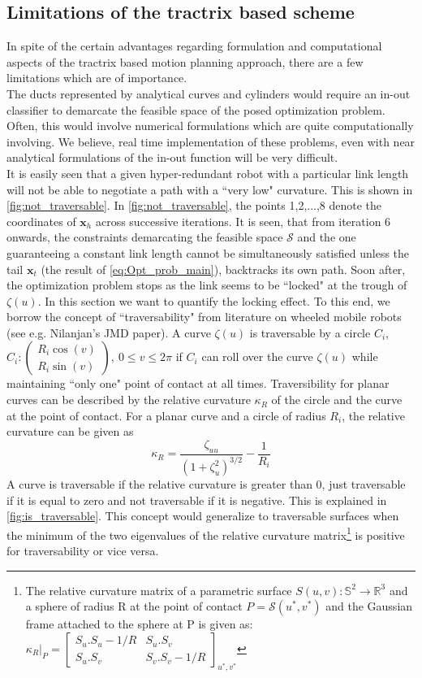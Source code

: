 \documentclass[12pt,a4]{article}
\begin{document}
\subsection{Limitations of the tractrix based scheme}
In spite of the certain advantages regarding formulation and computational aspects of the tractrix based motion planning approach, there are a few limitations which are of importance.\\
The ducts represented by analytical curves and cylinders would require an in-out classifier to demarcate the feasible space of the posed optimization problem. Often, this would involve numerical formulations which are quite computationally involving. We believe, real time implementation of these problems, even with near analytical formulations of the in-out function will be very difficult.\\
It is easily seen that a given hyper-redundant robot with a particular link length will not be able to negotiate a path with a ``very low" curvature. This is shown in \cref{fig:not_traversable}. In \cref{fig:not_traversable}, the points 1,2,...,8 denote the coordinates of $\textbf{x}_h$ across successive iterations. It is seen, that from iteration 6 onwards, the constraints demarcating the feasible space $\mathcal{S}$ and the one guaranteeing a constant link length cannot be simultaneously satisfied unless the tail $\textbf{x}_t$ (the result of \cref{eq:Opt_prob_main}), backtracks its own path. Soon after, the optimization problem stops as the link seems to be ``locked" at the trough of $\zeta(u)$. In this section we want to quantify the locking effect. To this end, we borrow the concept of ``traversability" from literature on wheeled mobile robots (see e.g. Nilanjan's JMD paper). A curve $\zeta(u)$ is traversable by a circle $C_i$, $C_i: \left(\begin{array}{c} R_i\cos(v) \\ R_i\sin(v) \end{array}\right), ~ 0 \leq v\leq2\pi $  if $C_i$ can roll over the curve $\zeta(u)$ while maintaining ``only one" point of contact at all times. Traversibility for planar curves can be described by the relative curvature $\kappa_R$ of the circle and the curve at the point of contact. For a planar curve and a circle of radius $R_i$, the relative curvature can be given as \[\kappa_R=\dfrac{\zeta_{uu}}{(1+\zeta_u^2)^{3/2}}-\dfrac{1}{R_i}\] A curve is traversable if the relative curvature is greater than 0, just traversable if it is equal to zero and not traversable if it is negative. This is explained in \cref{fig:is_traversable}. This concept would generalize to traversable surfaces when the minimum of the two eigenvalues of the relative curvature matrix\footnote{The relative curvature matrix of a parametric surface ${S}(u,v): \mathbb{S}^2\to \mathbb{R}^3$ and a sphere of radius R at the point of contact $P = \mathcal{S}(u^*,v^*)$ and the Gaussian frame attached to the sphere at P is given as: $\kappa_R\vert_P=\left[\begin{array}{cc}
	{S}_u.{S}_u-1/R & {S}_u.{S}_v \\ 
	{S}_u.{S}_v & {S}_v.{S}_v-1/R
	\end{array}\right]_{u^*,v^*} $} is positive for traversability or vice versa.
\end{document}
